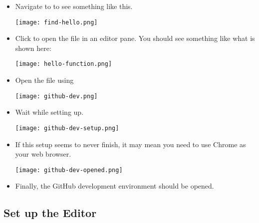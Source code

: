 \begin{itemize}
\item Navigate to  to see something like this.

\noindent\texttt{[image: find-hello.png]}



\item Click  to open the file in an editor pane.  You
  should see something like what is shown here:

\noindent\texttt{[image: hello-function.png]}


\item Open the file using 

\noindent\texttt{[image: github-dev.png]}


\item Wait while setting up.

\noindent\texttt{[image: github-dev-setup.png]}

\item If this setup seems to never finish, it may mean you need to use Chrome as your web browser.



\noindent\texttt{[image: github-dev-opened.png]}

\item Finally, the GitHub development environment should be opened.

\end{itemize}

\subsection{Set up the Editor}
  
